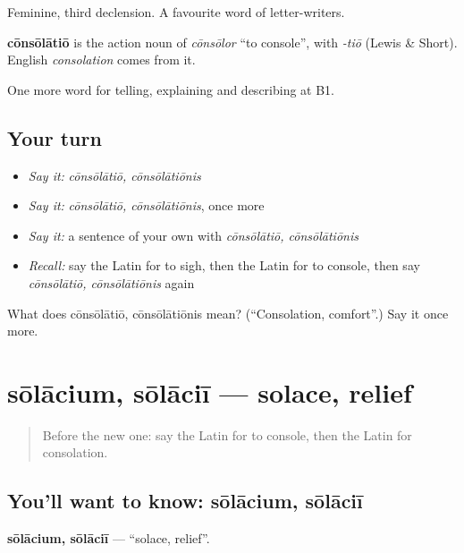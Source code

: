 Feminine, third declension. A favourite word of letter-writers.

\begin{cousinweb}
\textbf{cōnsōlātiō} is the action noun of \emph{cōnsōlor} \textquotedblleft{}to console\textquotedblright{}, with \emph{-tiō} (Lewis \& Short). English \emph{consolation} comes from it.
\end{cousinweb}

\begin{grammarlens}[title={What you've built}]
One more word for telling, explaining and describing at B1.
\end{grammarlens}

\subsection*{Your turn}
\begin{itemize}
\raggedright
  \item \emph{Say it:} \emph{cōnsōlātiō, cōnsōlātiōnis}
  \item \emph{Say it:} \emph{cōnsōlātiō, cōnsōlātiōnis}, once more
  \item \emph{Say it:} a sentence of your own with \emph{cōnsōlātiō, cōnsōlātiōnis}
  \item \emph{Recall:} say the Latin for to sigh, then the Latin for to console, then say \emph{cōnsōlātiō, cōnsōlātiōnis} again
\end{itemize}

\begin{tcolorbox}[breakable,colback=teal!4,colframe=teal!35!black,title={Before you move on}]
What does cōnsōlātiō, cōnsōlātiōnis mean? (\textquotedblleft{}Consolation, comfort\textquotedblright{}.) Say it once more.
\end{tcolorbox}
\section[sōlācium, sōlāciī]{sōlācium, sōlāciī — solace, relief}

\label{lesson:LA-C492-solacium}



\begin{quote}
Before the new one: say the Latin for to console, then the Latin for consolation.
\end{quote}

\subsection*{You'll want to know: sōlācium, sōlāciī}
\textbf{sōlācium, sōlāciī} — \textquotedblleft{}solace, relief\textquotedblright{}.

